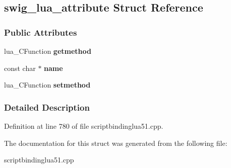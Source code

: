\hypertarget{structswig__lua__attribute}{
\subsection{swig\_\-lua\_\-attribute Struct Reference}
\label{structswig__lua__attribute}
}
\subsubsection*{Public Attributes}
\begin{DoxyCompactItemize}
\item 
\hypertarget{structswig__lua__attribute_ab18a92c81433b7b3de23856cda4b89b5}{
lua\_\-CFunction {\bfseries getmethod}}
\label{structswig__lua__attribute_ab18a92c81433b7b3de23856cda4b89b5}

\item 
\hypertarget{structswig__lua__attribute_a693d9481784dfd89e0d9ed3aadf51b04}{
const char $\ast$ {\bfseries name}}
\label{structswig__lua__attribute_a693d9481784dfd89e0d9ed3aadf51b04}

\item 
\hypertarget{structswig__lua__attribute_a0b88e38d5417453e7718f7090b797b06}{
lua\_\-CFunction {\bfseries setmethod}}
\label{structswig__lua__attribute_a0b88e38d5417453e7718f7090b797b06}

\end{DoxyCompactItemize}


\subsubsection{Detailed Description}


Definition at line 780 of file scriptbindinglua51.cpp.



The documentation for this struct was generated from the following file:\begin{DoxyCompactItemize}
\item 
scriptbindinglua51.cpp\end{DoxyCompactItemize}
